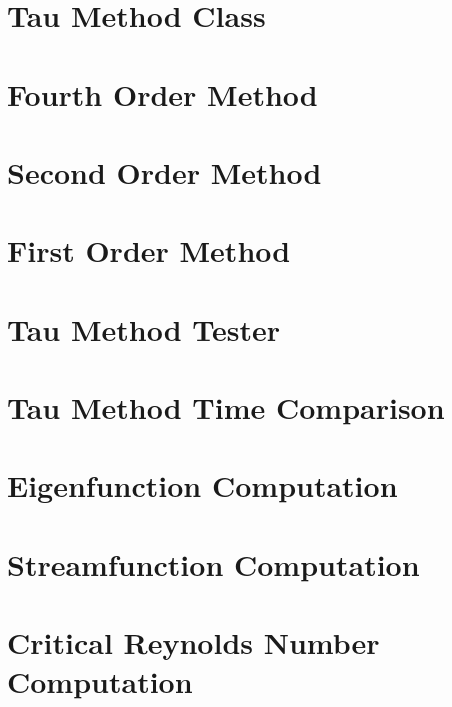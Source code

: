 \section{Tau Method Class} \label{code:tauclass} 

\newpage

\section{Fourth Order Method} \label{code:fourthorder}

\newpage

\section{Second Order Method} \label{code:secondorder}

\newpage

\section{First Order Method} \label{code:firstorder}

\newpage

\section{Tau Method Tester} \label{code:tautester}

\newpage

\section{Tau Method Time Comparison} \label{code:timecomp}

\newpage

% 

\section{Eigenfunction Computation} \label{code:eigenfunction}

\newpage

\section{Streamfunction Computation} \label{code:streamfunction}

\newpage

\section{Critical Reynolds Number Computation} \label{code:criticalR}


